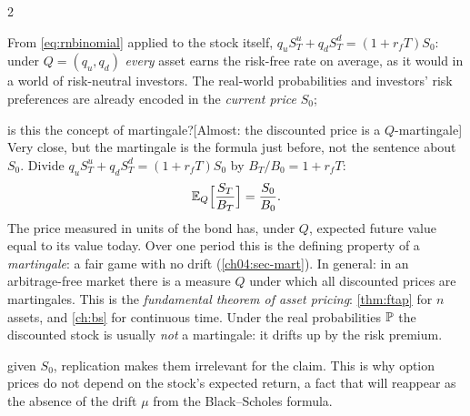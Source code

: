 \begin{paracol}{2}
\begin{intuition}
From \eqref{eq:rnbinomial} applied to the stock itself,
$q_uS_T^u+q_dS_T^d=(1+r_fT)S_0$: under $Q=(q_u,q_d)$ \emph{every} asset earns the risk-free rate on
average, as it would in a world of risk-neutral investors. The real-world probabilities and
investors' risk preferences are already encoded in the \emph{current price} $S_0$;\begin{answer}{is this the concept of martingale?}[Almost: the discounted price is a $Q$-martingale]
Very close, but the martingale is the formula just before, not the sentence about $S_0$. Divide
$q_uS_T^u+q_dS_T^d=(1+r_fT)S_0$ by $B_T/B_0=1+r_fT$:
\[
  \mathbb{E}_Q\Bigl[\frac{S_T}{B_T}\Bigr]=\frac{S_0}{B_0}.
\]
The price measured in units of the bond has, under $Q$, expected future value equal to its value today.
Over one period this is the defining property of a \emph{martingale}: a fair game with no drift
(\cref{ch04:sec-mart}). In general: in an arbitrage-free market there is a measure $Q$ under which all
discounted prices are martingales. This is the \emph{fundamental theorem of asset pricing}: \cref{thm:ftap}
for $n$ assets, and \cref{ch:bs} for continuous time. Under the real probabilities $\mathbb{P}$ the
discounted stock is usually \emph{not} a martingale: it drifts up by the risk premium.
\end{answer} given $S_0$,
replication makes them irrelevant for the claim. This is why option prices do not depend on the
stock's expected return, a fact that will reappear as the absence of the drift $\mu$ from the
Black--Scholes formula.
\end{intuition}


\end{paracol}

